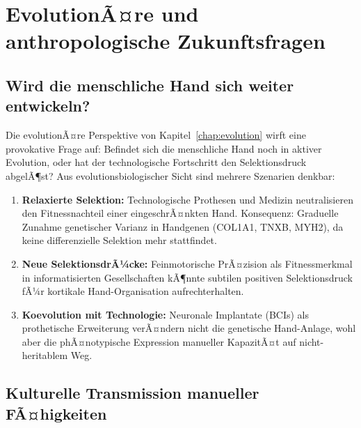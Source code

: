 ﻿\documentclass[12pt,a4paper]{report}
\theoremstyle{plain}
\theoremstyle{definition}
\theoremstyle{remark}
\begin{document}
\section{EvolutionÃ¤re und anthropologische Zukunftsfragen}

\subsection{Wird die menschliche Hand sich weiter entwickeln?}

Die evolutionÃ¤re Perspektive von Kapitel~\ref{chap:evolution} wirft
eine provokative Frage auf: Befindet sich die menschliche Hand noch in
aktiver Evolution, oder hat der technologische Fortschritt den
Selektionsdruck abgelÃ¶st? Aus evolutionsbiologischer Sicht sind
mehrere Szenarien denkbar:

\begin{enumerate}
\item \textbf{Relaxierte Selektion:} Technologische Prothesen und
  Medizin neutralisieren den Fitnessnachteil einer eingeschrÃ¤nkten Hand.
  Konsequenz: Graduelle Zunahme genetischer Varianz in Handgenen
  (COL1A1, TNXB, MYH2), da keine differenzielle Selektion mehr stattfindet.
\item \textbf{Neue SelektionsdrÃ¼cke:} Feinmotorische PrÃ¤zision als
  Fitnessmerkmal in informatisierten Gesellschaften kÃ¶nnte subtilen
  positiven Selektionsdruck fÃ¼r kortikale Hand-Organisation aufrechterhalten.
\item \textbf{Koevolution mit Technologie:} Neuronale Implantate (BCIs)
  als prothetische Erweiterung verÃ¤ndern nicht die genetische Hand-Anlage,
  wohl aber die phÃ¤notypische Expression manueller KapazitÃ¤t auf
  nicht-heritablem Weg.
\end{enumerate}

\subsection{Kulturelle Transmission manueller FÃ¤higkeiten}
\end{document}
